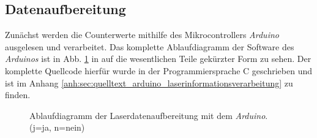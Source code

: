 \subsection{Datenaufbereitung}\label{subsec:datenaufbereitung}
Zunächst werden die Counterwerte mithilfe des Mikrocontrollers \textit{Arduino}
ausgelesen und verarbeitet. Das komplette Ablaufdiagramm der Software des
\textit{Arduinos} ist in Abb. \ref{fig:ablaufdiagramm_arduino_laser} in auf die
wesentlichen Teile gekürzter Form zu sehen. Der komplette Quellcode hierfür
wurde in der Programmiersprache C geschrieben und ist im Anhang
\ref{anh:sec:quelltext_arduino_laserinformationsverarbeitung} zu finden.
\begin{figure}[hp]
 	\centering
	\caption[Laserdatenaufbereitung -
	Ablaufdiagramm]{Ablaufdiagramm der Laserdatenaufbereitung mit dem
	\textit{Arduino}. (j=ja, n=nein)}
	\label{fig:ablaufdiagramm_arduino_laser}
\end{figure}
